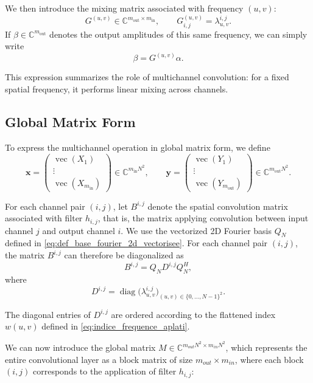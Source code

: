 We then introduce the mixing matrix associated with frequency $(u,v)$:
\[
    G^{(u,v)} \in \mathbb{C}^{m_{\mathrm{out}}\times m_{\mathrm{in}}},
    \qquad
    G^{(u,v)}_{i,j}
    =
    \lambda^{i,j}_{u,v}.
\]
If $\beta\in\mathbb{C}^{m_{\mathrm{out}}}$ denotes the output amplitudes of this same frequency,
we can simply write
\[
    \beta = G^{(u,v)}\alpha.
\]

This expression summarizes the role of multichannel convolution: for a fixed spatial frequency,
it performs linear mixing across channels.

\subsection{Global Matrix Form}

To express the multichannel operation in global matrix form, we define
\[
\mathbf{x}
=
\begin{pmatrix}
\operatorname{vec}(X_1) \\
\vdots \\
\operatorname{vec}(X_{m_{\mathrm{in}}})
\end{pmatrix}
\in \mathbb{C}^{m_{\mathrm{in}}N^2},
\qquad
\mathbf{y}
=
\begin{pmatrix}
\operatorname{vec}(Y_1) \\
\vdots \\
\operatorname{vec}(Y_{m_{\mathrm{out}}})
\end{pmatrix}
\in \mathbb{C}^{m_{\mathrm{out}}N^2}.
\]

For each channel pair $(i,j)$, let $B^{i,j}$ denote the spatial convolution matrix
associated with filter $h_{i,j}$, that is, the matrix applying convolution between input
channel $j$ and output channel $i$.
We use the vectorized 2D Fourier basis $Q_N$ defined in
\eqref{eq:def_base_fourier_2d_vectorisee}. For each channel pair $(i,j)$, the matrix
$B^{i,j}$ can therefore be diagonalized as
\[
    B^{i,j}
    =
    Q_N D^{i,j} Q_N^H,
\]
where
\[
D^{i,j}
=
\operatorname{diag}\bigl(
\lambda^{i,j}_{u,v}
\bigr)_{(u,v)\in\{0,\dots,N-1\}^2}.
\]

The diagonal entries of $D^{i,j}$ are ordered according to the flattened index
$w(u,v)$ defined in \eqref{eq:indice_frequence_aplati}.

We can now introduce the global matrix $M \in \mathbb{C}^{m_{out}N^2 \times m_{in}N^2}$,
which represents the entire convolutional layer as a block matrix of size
$m_{out} \times m_{in}$, where each block $(i,j)$ corresponds to the application of filter $h_{i,j}$:

